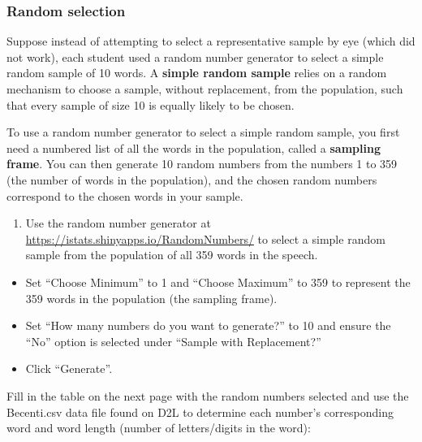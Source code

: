 \documentclass[
]{report}
\providecommand{\tightlist}{%
  \setlength{\itemsep}{0pt}\setlength{\parskip}{0pt}}
\begin{document}
\subsubsection*{Random selection}\label{random-selection}

Suppose instead of attempting to select a representative sample by eye (which did not work), each student used a random number generator to select a simple random sample of 10 words. A \textbf{simple random sample} relies on a random mechanism to choose a sample, without replacement, from the population, such that every sample of size 10 is equally likely to be chosen.

To use a random number generator to select a simple random sample, you first need a numbered list of all the words in the population, called a \textbf{sampling frame}. You can then generate 10 random numbers from the numbers 1 to 359 (the number of words in the population), and the chosen random numbers correspond to the chosen words in your sample.

\begin{enumerate}
\def\labelenumi{\arabic{enumi}.}
\setcounter{enumi}{4}
\tightlist
\item
  Use the random number generator at \url{https://istats.shinyapps.io/RandomNumbers/} to select a simple random sample from the population of all 359 words in the speech.
\end{enumerate}

\begin{itemize}
\item
  Set ``Choose Minimum'' to 1 and ``Choose Maximum'' to 359 to represent the 359 words in the population (the sampling frame).
\item
  Set ``How many numbers do you want to generate?'' to 10 and ensure the ``No'' option is selected under ``Sample with Replacement?''
\item
  Click ``Generate''.
\end{itemize}

Fill in the table on the next page with the random numbers selected and use the Becenti.csv data file found on D2L to determine each number's corresponding word and word length (number of letters/digits in the word):
\end{document}
